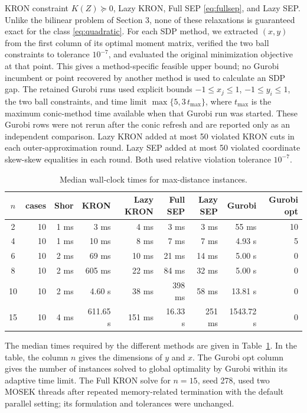 \documentclass[11pt]{article}
\begin{document}
KRON constraint \(K(Z)\succeq 0\), Lazy KRON, Full SEP \eqref{eq:fullsep}, and
Lazy SEP.
Unlike the bilinear problem of Section 3, none of these relaxations is
guaranteed exact for the class \eqref{eq:quadratic}.  For each SDP method, we extracted
\((x,y)\) from the first column of its optimal moment matrix, verified the two
ball constraints to tolerance \(10^{-7}\), and evaluated the original
minimization objective at that point.  This gives a method-specific feasible
upper bound; no Gurobi incumbent or point recovered by another method is used
to calculate an SDP gap.  The retained Gurobi runs used explicit bounds \(-1\le x_j\le 1\), \(-1\le y_i\le 1\), the two ball constraints, and time limit \(\max\{5,3\,t_{\max}\}\), where \(t_{\max}\) is the maximum conic-method time available when that Gurobi run was started.  These Gurobi rows were not rerun after the conic refresh and are reported only as an independent comparison.  Lazy KRON added at most 50 violated KRON cuts in each
outer-approximation round.  Lazy SEP added at most 50 violated coordinate
skew-skew equalities in each round.  Both used relative violation tolerance
\(10^{-7}\).

\begin{table}[htbp]
\centering
\caption{Median wall-clock times for max-distance instances.}
\label{tab:maxdist_times}
\small
\begin{tabular}{c r r r r r r r r}
\hline
$n$ & cases & Shor & KRON & Lazy KRON & Full SEP & Lazy SEP & Gurobi & Gurobi opt \\
\hline
2 & 10 & 1 ms & 3 ms & 4 ms & 3 ms & 3 ms & 55 ms & 10 \\
4 & 10 & 1 ms & 10 ms & 8 ms & 7 ms & 7 ms & 4.93 s & 5 \\
6 & 10 & 2 ms & 69 ms & 10 ms & 21 ms & 14 ms & 5.00 s & 0 \\
8 & 10 & 2 ms & 605 ms & 22 ms & 84 ms & 32 ms & 5.00 s & 0 \\
10 & 10 & 2 ms & 4.60 s & 38 ms & 398 ms & 58 ms & 13.81 s & 0 \\
15 & 10 & 4 ms & 611.65 s & 151 ms & 16.33 s & 251 ms & 1543.72 s & 0 \\
\hline
\hline
\end{tabular}
\end{table}

The median times required by the different methods are given in
Table~\ref{tab:maxdist_times}.  In the table, the column \(n\) gives the
dimensions of \(y\) and \(x\).  The Gurobi opt column gives the
number of instances solved to global optimality by Gurobi within its adaptive
time limit.  The Full KRON solve for \(n=15\), seed 278, used two MOSEK
threads after repeated memory-related termination with the default parallel
setting; its formulation and tolerances were unchanged.
\end{document}

